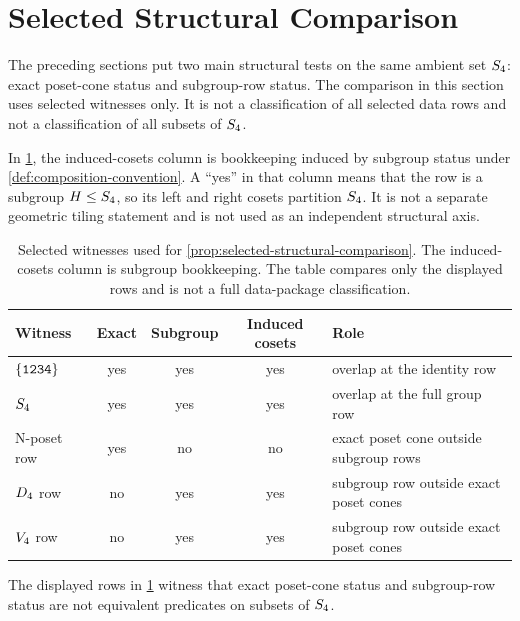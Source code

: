 \section{Selected Structural Comparison}
\label{sec:selected-comparison}

The preceding sections put two main structural tests on the same ambient set \(S_4\): exact poset-cone status and subgroup-row status. The comparison in this section uses selected witnesses only. It is not a classification of all selected data rows and not a classification of all subsets of \(S_4\).

In \cref{tab:selected-witnesses}, the induced-cosets column is bookkeeping induced by subgroup status under \cref{def:composition-convention}. A ``yes'' in that column means that the row is a subgroup \(H\le S_4\), so its left and right cosets partition \(S_4\). It is not a separate geometric tiling statement and is not used as an independent structural axis.

\begin{table}[htbp]
\centering
\small
\begin{tabular}{@{}p{}ccc p{}@{}}
\toprule
Witness & Exact & Subgroup & Induced cosets & Role \\
\midrule
\(\{\texttt{1234}\}\) & yes & yes & yes & overlap at the identity row \\
\(S_4\) & yes & yes & yes & overlap at the full group row \\
N-poset row & yes & no & no & exact poset cone outside subgroup rows \\
\(D_4\) row & no & yes & yes & subgroup row outside exact poset cones \\
\(V_4\) row & no & yes & yes & subgroup row outside exact poset cones \\
\bottomrule
\end{tabular}
\caption{Selected witnesses used for \cref{prop:selected-structural-comparison}. The induced-cosets column is subgroup bookkeeping. The table compares only the displayed rows and is not a full data-package classification.}
\label{tab:selected-witnesses}
\end{table}

\begin{theorem}
\label{prop:selected-structural-comparison}
The displayed rows in \cref{tab:selected-witnesses} witness that exact poset-cone status and subgroup-row status are not equivalent predicates on subsets of \(S_4\).
\end{theorem}

